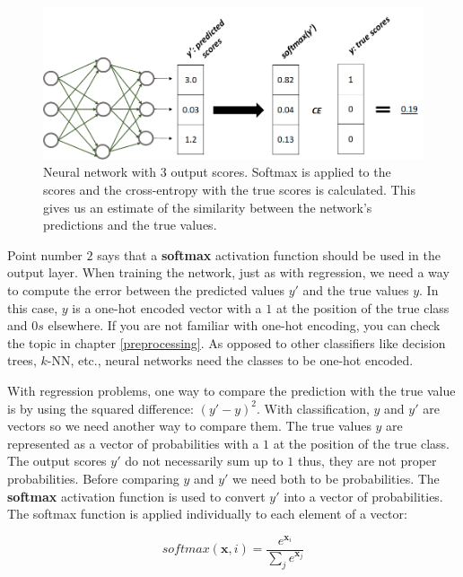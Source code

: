 \documentclass[
  11pt,
]{krantz}
\begin{document}
\begin{figure}

{\centering \includegraphics[width=1\linewidth]{images/nn_cross-entropy} 

}

\caption{Neural network with 3 output scores. Softmax is applied to the scores and the cross-entropy with the true scores is calculated. This gives us an estimate of the similarity between the network's predictions and the true values.}\label{fig:nnCrossEntropy}
\end{figure}

Point number \(2\) says that a \textbf{softmax} activation function should be used in the output layer. When training the network, just as with regression, we need a way to compute the error between the predicted values \(y'\) and the true values \(y\). In this case, \(y\) is a one-hot encoded vector with a \(1\) at the position of the true class and \(0s\) elsewhere. If you are not familiar with one-hot encoding, you can check the topic in chapter \ref{preprocessing}. As opposed to other classifiers like decision trees, \(k\)-NN, etc., neural networks need the classes to be one-hot encoded.

With regression problems, one way to compare the prediction with the true value is by using the squared difference: \((y' - y)^2\). With classification, \(y\) and \(y'\) are vectors so we need another way to compare them. The true values \(y\) are represented as a vector of probabilities with a \(1\) at the position of the true class. The output scores \(y'\) do not necessarily sum up to \(1\) thus, they are not proper probabilities. Before comparing \(y\) and \(y'\) we need both to be probabilities. The \textbf{softmax} activation function is used to convert \(y'\) into a vector of probabilities. The softmax function is applied individually to each element of a vector:

\begin{equation}
  softmax(\boldsymbol{x},i) = \frac{e^{\boldsymbol{x}_i}}{\sum_{j}{e^{\boldsymbol{x}_j}}}
  \label{eq:softmax}
\end{equation}
\end{document}
